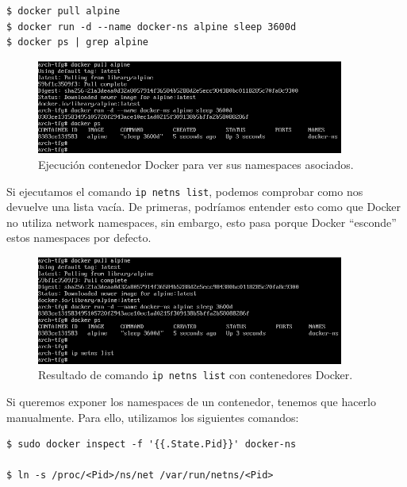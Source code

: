 \documentclass[12pt]{article}
\begin{document}
	\begin{verbatim}
$ docker pull alpine
$ docker run -d --name docker-ns alpine sleep 3600d
$ docker ps | grep alpine
	\end{verbatim}

	\begin{figure}[h!]
		\begin{center}
			\includegraphics[width=0.9\textwidth]{img/docker_ns1.png}
			\caption{Ejecución contenedor Docker para ver sus namespaces asociados.}
		\end{center}
	\end{figure}

	\noindent Si ejecutamos el comando \texttt{ip netns list}, podemos comprobar como nos devuelve una lista vacía. De primeras, podríamos entender esto como que Docker no utiliza network namespaces, sin embargo, esto pasa porque Docker ``esconde'' estos namespaces por defecto.
	
	\begin{figure}[h!]
		\begin{center}
			\includegraphics[width=0.9\textwidth]{img/docker_ns2.png}
			\caption{Resultado de comando \texttt{ip netns list} con contenedores Docker.}
		\end{center}
	\end{figure}

	\pagebreak
	
	\noindent Si queremos exponer los namespaces de un contenedor, tenemos que hacerlo manualmente. Para ello, utilizamos los siguientes comandos:
	
	\begin{verbatim}
$ sudo docker inspect -f '{{.State.Pid}}' docker-ns

$ ln -s /proc/<Pid>/ns/net /var/run/netns/<Pid>
	\end{verbatim}
\end{document}
